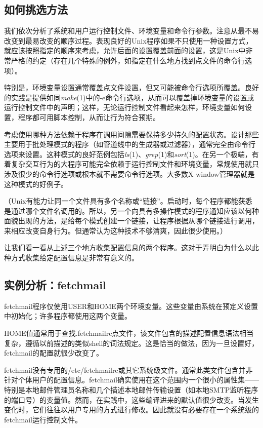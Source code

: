 \documentclass[12pt,oneside]{ctexbook}
\begin{document}
\begin{common-format}
\section{如何挑选方法}
我们依次分析了系统和用户运行控制文件、环境变量和命令行参数。注意从最不易改变到最易改变的顺序过程。表现良好的Unix程序如果不只使用一种设置方式，就应该按照指定的顺序来考虑，允许后面的设置覆盖前面的设置，这是Unix中非常严格的约定（存在几个特殊的例外，如指定在什么地方找到点文件的命令行选项）。

特别是，环境变量设置通常覆盖点文件设置，但又可能被命令行选项所覆盖。良好的实践是提供如同\textit{make}(1)中的-e命令行选项，从而可以覆盖掉环境变量的设置或运行控制文件中的声明；这样，无论运行控制文件看起来怎样，环境变量如何设置，程序都可用脚本控制，从而让行为符合预期。

考虑使用哪种方法依赖于程序在调用间隙需要保持多少持久的配置状态。设计那些主要用于批处理模式的程序（如管道线中的生成器或过滤器），通常完全由命令行选项来设置。这种模式的良好范例包括\textit{ls}(1)、\textit{grep}(1)和\textit{sort}(1)。在另一个极端，有着复杂交互行为的大程序可能完全依赖于运行控制文件和环境变量，常规使用就只涉及很少的命令行选项或根本就不需要命令行选项。大多数X window管理器就是这种模式的好例子。

（Unix有能力让同一个文件具有多个名称或“链接”。启动时，每个程序都能获悉是通过哪个文件名调用的。所以，另一个向具有多操作模式的程序通知应该以何种面貌出现的方法，是给每个模式创建一个链接，让程序根据从哪个链接进行调用，来相应改变自身行为。但通常认为这种技术不够清爽，因此很少使用。）

让我们看一看从上述三个地方收集配置信息的两个程序。这对于弄明白为什么以此种方式收集给定配置信息是非常有意义的。

\subsection{实例分析：fetchmail}
fetchmail程序仅使用USER和HOME两个环境变量。这些变量由系统在预定义设置中初始化；许多程序都使用这两个变量。

HOME值通常用于查找.fetchmailrc点文件，该文件包含的描述配置信息语法相当复杂，遵循以前描述的类似shell的词法规定。这是恰当的做法，因为一旦设置好，fetchmail的配置就很少改变了。

fetchmail没有专用的/etc/fetchmailrc或其它系统级文件。通常此类文件包含并非针对个体用户的配置信息。fetchmail确实使用在这个范围内一个很小的属性集——特别是本地邮件管理员名称和几个描述本地邮件传输设置（如本地SMTP监听程序的端口号）的变量值。然而，在实践中，这些编译进来的默认值很少改变。当发生变化时，它们往往以用户专用的方式进行修改。因此就没有必要存在一个系统级的fetchmail运行控制文件。


\end{common-format}
\end{document}
